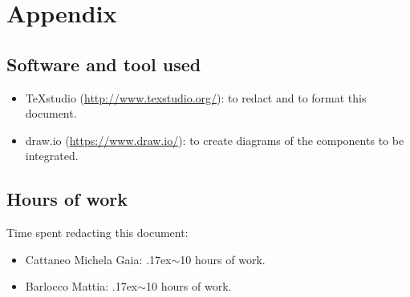 \documentclass[18pt,oneside,a4paper, titlepage]{article}
\begin{document}
	\section{Appendix}
	\subsection{Software and tool used}
		\begin{itemize}
			\item TeXstudio (\url{http://www.texstudio.org/}): to redact and to format this document.
			\item draw.io (\url{https://www.draw.io/}): to create diagrams of the components to be integrated.
		\end{itemize}
	
	\subsection{Hours of work}
		Time spent redacting this document:
		\begin{itemize}
			\item Cattaneo Michela Gaia: {\raise.17ex\hbox{$\scriptstyle\sim$}}10 hours of work.
			\item Barlocco Mattia: {\raise.17ex\hbox{$\scriptstyle\sim$}}10 hours of work.
		\end{itemize}
\end{document}
